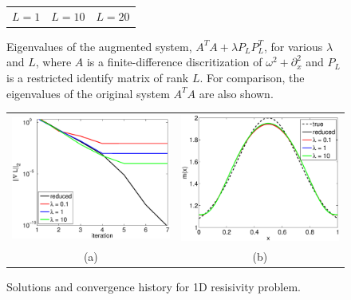 \documentclass{iopart}
\begin{document}
\begin{figure}
\begin{tabular}{ccc}
{\small $L = 1$}&{\small $L = 10$}&{\small $L = 20$}\\
\end{tabular}
\caption{Eigenvalues of the augmented system,  $A^TA + \lambda P_LP_L^T$, for various $\lambda$ and $L$, where $A$ is a finite-difference discritization of $\omega^2 + \partial_x^2$
and $P_L$ is a restricted identify matrix of rank $L$. For comparison, the eigenvalues of the original system $A^TA$ are also shown.}
\label{fig:example3}
\end{figure}

\begin{figure}
\centering
\begin{tabular}{cc}
\includegraphics[scale=.4]{./figs/1D_exp1_a}&
\includegraphics[scale=.4]{./figs/1D_exp1_b}\\
{\small (a)}&{\small (b)}\\
\end{tabular}
\caption{Solutions and convergence history for 1D resisivity problem.}
\label{fig:1D_exp1}
\end{figure}
\end{document}
